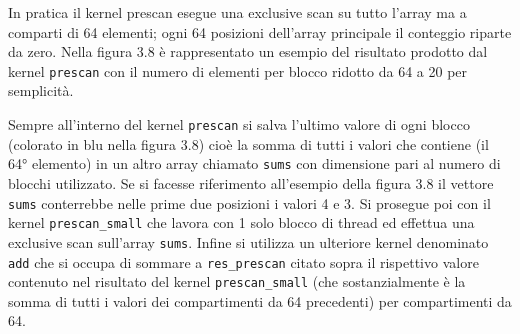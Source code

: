 \documentclass[12pt,a4paper]{report}
\begin{document}
In pratica il kernel prescan esegue una exclusive scan su tutto l’array ma a comparti di 64 elementi; ogni 64 posizioni dell’array principale il conteggio riparte da zero. \newline 
Nella figura 3.8 è rappresentato un esempio del risultato prodotto dal kernel \verb|prescan| con il numero di elementi per blocco ridotto da 64 a 20 per semplicità.
\begin{figure}[H]
\centering
\begin{floatrow}[1]
\end{floatrow}
\end{figure} 
Sempre all’interno del kernel \verb|prescan| si salva l’ultimo valore di ogni blocco (colorato in blu nella figura 3.8) cioè la somma di tutti i valori che contiene (il 64° elemento) in un altro array chiamato \verb|sums| con dimensione pari al numero di blocchi utilizzato. Se si facesse riferimento all'esempio della figura 3.8 il vettore \verb|sums| conterrebbe nelle prime due posizioni i valori 4 e 3.
Si prosegue poi con il kernel \verb|prescan_small| che lavora con 1 solo blocco di thread ed effettua una exclusive scan sull’array \verb|sums|.
Infine si utilizza un ulteriore kernel denominato \verb|add| che si occupa di sommare a \verb|res_prescan| citato sopra il rispettivo valore contenuto nel risultato del kernel \verb|prescan_small| (che sostanzialmente è la somma di tutti i valori dei compartimenti da 64 precedenti) per compartimenti da 64. \newpage
\end{document}
